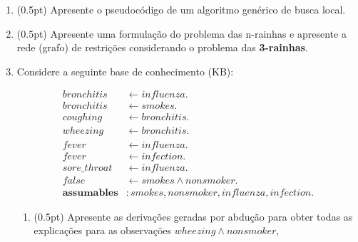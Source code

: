 \documentclass{article}
\begin{document}
\begin{enumerate}
\begin{enumerate}
        
    \end{enumerate}
    
    \pagebreak
    
    \item (0.5pt) Apresente o pseudocódigo de um algoritmo genérico de busca local.
    
    
    \item (0.5pt) Apresente uma formulação do problema das n-rainhas e apresente a rede (grafo) de restrições considerando o problema das \textbf{3-rainhas}.
        
        
    \pagebreak    

    \item Considere a seguinte base de conhecimento (KB):
    \begin{center}
      \begin{align*}
bronchitis & \leftarrow influenza.\\
bronchitis & \leftarrow smokes.\\
coughing & \leftarrow bronchitis.\\
wheezing & \leftarrow bronchitis.\\
fever & \leftarrow influenza.\\
fever & \leftarrow infection.\\
sore\_throat & \leftarrow influenza.\\
false & \leftarrow smokes \wedge nonsmoker.\\
\textbf{assumables}&:  smokes, nonsmoker, influenza, infection.
      \end{align*}
    \end{center}
    
    
    \begin{enumerate}
        \item (0.5pt) Apresente as derivações geradas por abdução para obter todas as explicações para as observações $wheezing \wedge nonsmoker$, 
        
        

\end{enumerate}
\end{enumerate}
\end{document}
